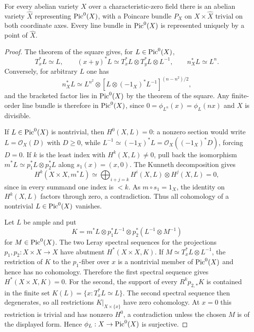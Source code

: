 \begin{theorem}
\label{mumford-thm-dual-char-zero}
For every abelian variety $X$ over a characteristic-zero field there is an
abelian variety $\widehat X$ representing $\operatorname{Pic}^0(X)$, with a Poincare bundle
$P_X$ on $X\times\widehat X$ trivial on both coordinate axes. Every line
bundle in $\operatorname{Pic}^0(X)$ is represented uniquely by a point of $\widehat X$.
\end{theorem}
\begin{proof}
The theorem of the square gives, for $L\in\operatorname{Pic}^0(X)$,
\[
 T_x^*L\simeq L,\qquad (x+y)^*L\simeq T_x^*L\otimes T_y^*L\otimes L^{-1},
 \qquad n_X^*L\simeq L^n.
\]
Conversely, for arbitrary $L$ one has
\[
 n_X^*L\simeq L^{n^2}\otimes
 [L\otimes(-1_X)^*L^{-1}]^{(n-n^2)/2},
\]
and the bracketed factor lies in $\operatorname{Pic}^0(X)$ by the theorem of the square.
Any finite-order line bundle is therefore in $\operatorname{Pic}^0(X)$, since
$0=\phi_{L^n}(x)=\phi_L(nx)$ and $X$ is divisible.

If $L\in\operatorname{Pic}^0(X)$ is nontrivial, then $H^0(X,L)=0$: a nonzero section would
write $L=\mathcal O_X(D)$ with $D\ge0$, while
$L^{-1}\simeq(-1_X)^*L=\mathcal O_X((-1_X)^*D)$, forcing $D=0$.  If $k$ is
the least index with $H^k(X,L)\ne0$, pull back the isomorphism
$m^*L\simeq p_1^*L\otimes p_2^*L$ along $s_1(x)=(x,0)$.  The Kunneth
decomposition gives
\[
 H^k(X\times X,m^*L)\simeq
 \bigoplus_{i+j=k}H^i(X,L)\otimes H^j(X,L)=0,
\]
since in every summand one index is $<k$.  As $m\circ s_1=1_X$, the identity
on $H^k(X,L)$ factors through zero, a contradiction.  Thus all cohomology
of a nontrivial $L\in\operatorname{Pic}^0(X)$ vanishes.

Let $L$ be ample and put
\[
 K=m^*L\otimes p_1^*L^{-1}\otimes p_2^*(L^{-1}\otimes M^{-1})
\]
for $M\in\operatorname{Pic}^0(X)$.  The two Leray spectral sequences for the projections
$p_1,p_2:X\times X\to X$ have abutment $H^*(X\times X,K)$.  If
$M\simeq T_x^*L\otimes L^{-1}$, the restriction of $K$ to the $p_1$-fiber
over $x$ is a nontrivial member of $\operatorname{Pic}^0(X)$ and hence has no cohomology.
Therefore the first spectral sequence gives $H^*(X\times X,K)=0$.  For the
second, the support of every $R^kp_{2,*}K$ is contained in the finite set
$K(L)=\{x:T_x^*L\simeq L\}$.  The second spectral sequence then degenerates,
so all restrictions $K|_{X\times\{x\}}$ have zero cohomology.  At $x=0$ this
restriction is trivial and has nonzero $H^0$, a contradiction unless the
chosen $M$ is of the displayed form.  Hence $\phi_L:X\to\operatorname{Pic}^0(X)$ is
surjective.


\end{proof}

